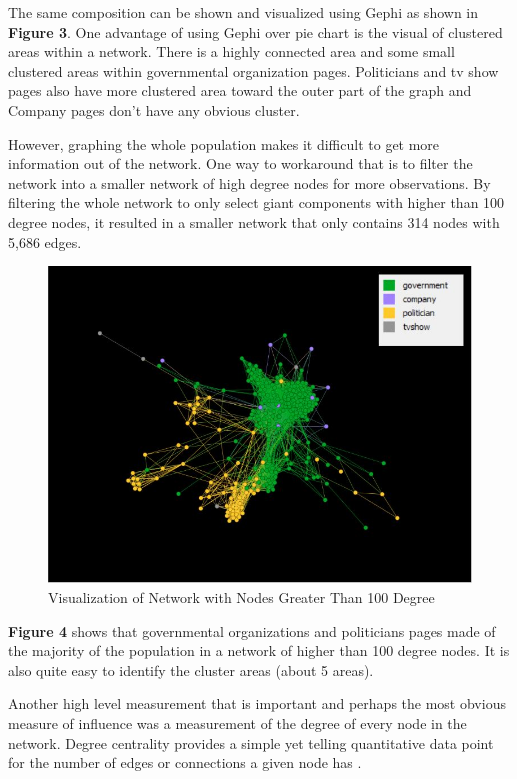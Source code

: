 \documentclass[11pt,twocolumn]{article}
\begin{document}
The same composition can be shown and visualized using Gephi as shown in \textbf{Figure 3}. One advantage of using Gephi over pie chart is the visual of clustered areas within a network. There is a highly connected area and some small clustered areas within governmental organization pages. Politicians and tv show pages also have more clustered area toward the outer part of the graph and Company pages don't have any obvious cluster. 

However, graphing the whole population makes it difficult to get more information out of the network. One way to workaround that is to filter the network into a smaller network of high degree nodes for more observations. By filtering the whole network to only select giant components with higher than 100 degree nodes, it resulted in a smaller network that only contains 314 nodes with 5,686 edges.


\begin{figure}[hbt!]
\includegraphics[scale=0.4]{gephi_filtered_100_degree.JPG} 
\caption{Visualization of Network with Nodes Greater Than 100 Degree}
\end{figure}

\textbf{Figure 4} shows that governmental organizations and politicians pages made of the majority of the population in a network of higher than 100 degree nodes. It is also quite easy to identify the cluster areas (about 5 areas).

Another high level measurement that is important and perhaps the most obvious measure of influence was a measurement of the degree of every node in the network. Degree centrality provides a simple yet telling quantitative data point for the number of edges or connections a given node has \cite{newman2008mathematics}.
\end{document}
